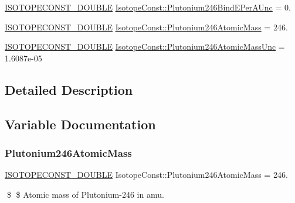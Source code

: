 \begin{DoxyCompactItemize}
\mbox{\hyperlink{group___isotope_const-_macros_ga8f45a7272ce02c0b4c65c44636ed719a}{I\+S\+O\+T\+O\+P\+E\+C\+O\+N\+S\+T\+\_\+\+D\+O\+U\+B\+LE}} \mbox{\hyperlink{group___isotope_const-_plutonium-_pu246_ga771a812b828dd2e97037467c7395f464}{Isotope\+Const\+::\+Plutonium246\+Bind\+E\+Per\+A\+Unc}} = 0.
\item 
\mbox{\hyperlink{group___isotope_const-_macros_ga8f45a7272ce02c0b4c65c44636ed719a}{I\+S\+O\+T\+O\+P\+E\+C\+O\+N\+S\+T\+\_\+\+D\+O\+U\+B\+LE}} \mbox{\hyperlink{group___isotope_const-_plutonium-_pu246_ga3000c968d78665c2774873e7d570a943}{Isotope\+Const\+::\+Plutonium246\+Atomic\+Mass}} = 246.
\item 
\mbox{\hyperlink{group___isotope_const-_macros_ga8f45a7272ce02c0b4c65c44636ed719a}{I\+S\+O\+T\+O\+P\+E\+C\+O\+N\+S\+T\+\_\+\+D\+O\+U\+B\+LE}} \mbox{\hyperlink{group___isotope_const-_plutonium-_pu246_ga467b68346ad9f3e20371097dd22dfe8a}{Isotope\+Const\+::\+Plutonium246\+Atomic\+Mass\+Unc}} = 1.\+6087e-\/05
\end{DoxyCompactItemize}


\subsection{Detailed Description}


\subsection{Variable Documentation}
\mbox{\label{group___isotope_const-_plutonium-_pu246_ga3000c968d78665c2774873e7d570a943}} 
\subsubsection{\texorpdfstring{Plutonium246\+Atomic\+Mass}{Plutonium246AtomicMass}}
{\footnotesize\ttfamily \mbox{\hyperlink{group___isotope_const-_macros_ga8f45a7272ce02c0b4c65c44636ed719a}{I\+S\+O\+T\+O\+P\+E\+C\+O\+N\+S\+T\+\_\+\+D\+O\+U\+B\+LE}} Isotope\+Const\+::\+Plutonium246\+Atomic\+Mass = 246.}

\$ \$ Atomic mass of Plutonium-\/246 in amu. \mbox{\label{group___isotope_const-_plutonium-_pu246_ga467b68346ad9f3e20371097dd22dfe8a}} 

